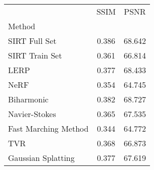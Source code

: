 \begin{tabular}{|l|c|c|}
\toprule
 & SSIM & PSNR \\
Method &  &  \\
\midrule
SIRT Full Set & 0.386 & 68.642 \\
SIRT Train Set & 0.361 & 66.814 \\
LERP & \cellcolor{rankthird}0.377 & \cellcolor{ranksecond}68.433 \\
NeRF & 0.354 & \cellcolor{rankworst}64.745 \\
Biharmonic & \cellcolor{rankfirst}0.382 & \cellcolor{rankfirst}68.727 \\
Navier-Stokes & 0.365 & 67.535 \\
Fast Marching Method & \cellcolor{rankworst}0.344 & 64.772 \\
TVR & 0.368 & 66.873 \\
Gaussian Splatting & \cellcolor{rankthird}0.377 & \cellcolor{rankthird}67.619 \\
\bottomrule
\end{tabular}
